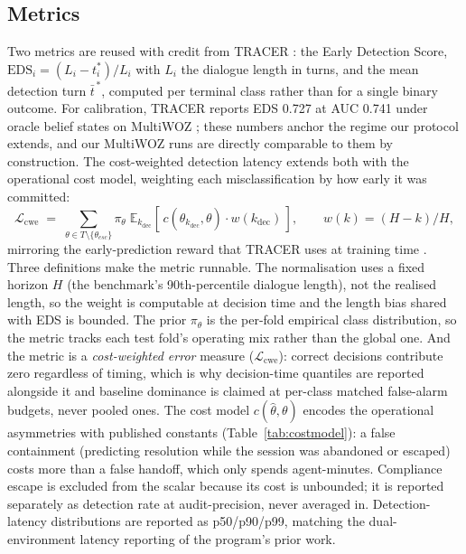 \subsection{Metrics}
Two metrics are reused with credit from TRACER \citep{nourbakhsh2026tracer}: the Early Detection Score, $\mathrm{EDS}_i = (L_i - t_i^*)/L_i$ with $L_i$ the dialogue length in turns, and the mean detection turn $\bar{t}^{\,*}$, computed per terminal class rather than for a single binary outcome.
For calibration, TRACER reports EDS 0.727 at AUC 0.741 under oracle belief states on MultiWOZ \citep{nourbakhsh2026tracer}; these numbers anchor the regime our protocol extends, and our MultiWOZ runs are directly comparable to them by construction.
The cost-weighted detection latency extends both with the operational cost model, weighting each misclassification by how early it was committed:
\begin{equation}
  \mathcal{L}_{\mathrm{cwe}} \;=\; \sum_{\theta \in T \setminus \{\theta_{esc}\}} \pi_\theta \;
  \mathbb{E}_{k_{\mathrm{dec}}}\!\left[\, c(\hat{\theta}_{k_{\mathrm{dec}}}, \theta) \cdot
  w(k_{\mathrm{dec}}) \,\right],
  \qquad w(k) = (H - k)/H,
  \label{eq:cost_weighted_error}
\end{equation}
mirroring the early-prediction reward that TRACER uses at training time \citep{nourbakhsh2026tracer}.
Three definitions make the metric runnable.
The normalisation uses a fixed horizon $H$ (the benchmark's 90th-percentile dialogue length), not the realised length, so the weight is computable at decision time and the length bias shared with EDS is bounded.
The prior $\pi_\theta$ is the per-fold empirical class distribution, so the metric tracks each test fold's operating mix rather than the global one.
And the metric is a \emph{cost-weighted error} measure ($\mathcal{L}_{\mathrm{cwe}}$): correct decisions contribute zero regardless of timing, which is why decision-time quantiles are reported alongside it and baseline dominance is claimed at per-class matched false-alarm budgets, never pooled ones.
The cost model $c(\hat{\theta}, \theta)$ encodes the operational asymmetries with published constants (Table~\ref{tab:costmodel}): a false containment (predicting resolution while the session was abandoned or escaped) costs more than a false handoff, which only spends agent-minutes.
Compliance escape is excluded from the scalar because its cost is unbounded; it is reported separately as detection rate at audit-precision, never averaged in.
Detection-latency distributions are reported as p50/p90/p99, matching the dual-environment latency reporting of the program's prior work.

